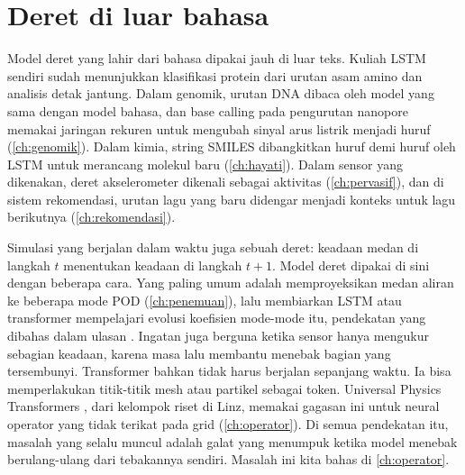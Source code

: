\section{Deret di luar bahasa}

Model deret yang lahir dari bahasa dipakai jauh di luar teks. Kuliah LSTM sendiri sudah menunjukkan
klasifikasi protein dari urutan asam amino dan analisis detak jantung. Dalam genomik, urutan DNA dibaca
oleh model yang sama dengan model bahasa, dan base calling pada pengurutan nanopore memakai jaringan
rekuren untuk mengubah sinyal arus listrik menjadi huruf (\cref{ch:genomik}). Dalam kimia, string SMILES
dibangkitkan huruf demi huruf oleh LSTM untuk merancang molekul baru (\cref{ch:hayati}). Dalam sensor yang
dikenakan, deret akselerometer dikenali sebagai aktivitas (\cref{ch:pervasif}), dan di sistem
rekomendasi, urutan lagu yang baru didengar menjadi konteks untuk lagu berikutnya
(\cref{ch:rekomendasi}).

Simulasi yang berjalan dalam waktu juga sebuah deret: keadaan medan di langkah $t$ menentukan
keadaan di langkah $t+1$. Model deret dipakai di sini dengan beberapa cara. Yang paling umum
adalah memproyeksikan medan aliran ke beberapa mode POD (\cref{ch:penemuan}), lalu membiarkan LSTM
atau transformer mempelajari evolusi koefisien mode-mode itu, pendekatan yang dibahas dalam ulasan
\citet{brunton2020}. Ingatan juga berguna ketika sensor hanya mengukur sebagian keadaan, karena
masa lalu membantu menebak bagian yang tersembunyi. Transformer bahkan tidak harus berjalan
sepanjang waktu. Ia bisa memperlakukan titik-titik mesh atau partikel sebagai token. Universal
Physics Transformers \citep{alkin2024}, dari kelompok riset di Linz, memakai gagasan ini untuk
neural operator yang tidak terikat pada grid (\cref{ch:operator}). Di semua pendekatan itu,
masalah yang selalu muncul adalah galat yang menumpuk ketika model menebak berulang-ulang dari
tebakannya sendiri. Masalah ini kita bahas di \cref{ch:operator}.

